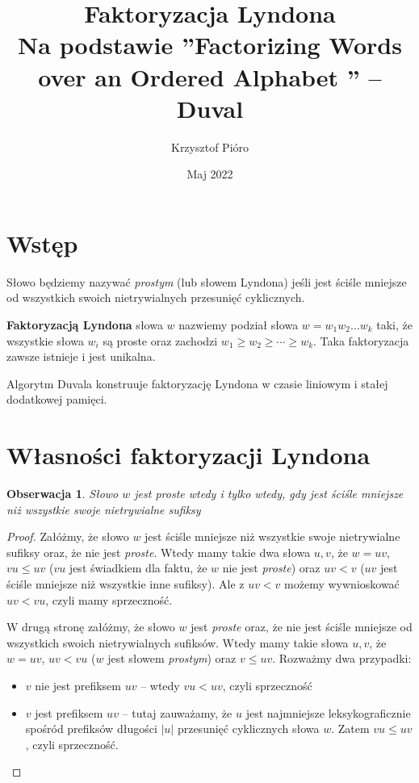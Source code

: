 \documentclass{article}
\title{Faktoryzacja Lyndona\\ \large Na podstawie ''Factorizing Words over an Ordered Alphabet '' -- Duval}
\author{Krzysztof Pióro}
\date{Maj 2022}
\newtheorem{observation}{Obserwacja}
\begin{document}
\maketitle

\section{Wstęp}

Słowo będziemy nazywać \textit{prostym} (lub słowem Lyndona) jeśli jest ściśle mniejsze od wszystkich swoich nietrywialnych przesunięć cyklicznych.

\textbf{Faktoryzacją Lyndona} słowa $w$ nazwiemy podział słowa $w = w_1w_2\ldots w_k$ taki, że wszystkie słowa $w_i$ są proste oraz zachodzi
$w_1 \geq w_2 \geq \cdots \geq w_k$. Taka faktoryzacja zawsze istnieje i jest unikalna.

Algorytm Duvala konstruuje faktoryzację Lyndona w czasie liniowym i stałej dodatkowej pamięci.

\section{Własności faktoryzacji Lyndona}

\begin{observation}
    Słowo $w$ jest \textit{proste} wtedy i tylko wtedy, gdy jest ściśle mniejsze niż wszystkie swoje nietrywialne sufiksy 
\end{observation}

\begin{proof}
    Załóżmy, że słowo $w$ jest ściśle mniejsze niż wszystkie swoje nietrywialne sufiksy oraz, że nie jest \textit{proste}.
    Wtedy mamy takie dwa słowa $u, v$, że $w = uv$, $vu \leq uv$ ($vu$ jest świadkiem dla faktu, że $w$ nie jest \textit{proste}) oraz $uv < v$ 
    ($uv$ jest ściśle mniejsze niż wszystkie inne sufiksy). Ale z $uv < v$ możemy wywnioskować $uv < vu$, czyli mamy sprzeczność.

    W drugą stronę załóżmy, że słowo $w$ jest \textit{proste} oraz, że nie jest ściśle mniejsze od wszystkich swoich nietrywialnych sufiksów.
    Wtedy mamy takie słowa $u, v$, że $w = uv$, $uv < vu$ ($w$ jest słowem \textit{prostym}) oraz $v \leq uv$. Rozważmy dwa przypadki:
    \begin{itemize}
        \item $v$ nie jest prefiksem $uv$ -- wtedy $vu < uv$, czyli sprzeczność
        \item $v$ jest prefiksem $uv$ -- tutaj zauważamy, że $u$ jest najmniejsze leksykograficznie spośród prefiksów długości $|u|$ przesunięć cyklicznych słowa $w$.
        Zatem $vu \leq uv$, czyli sprzeczność.
    \end{itemize} 
\end{proof}
\end{document}
